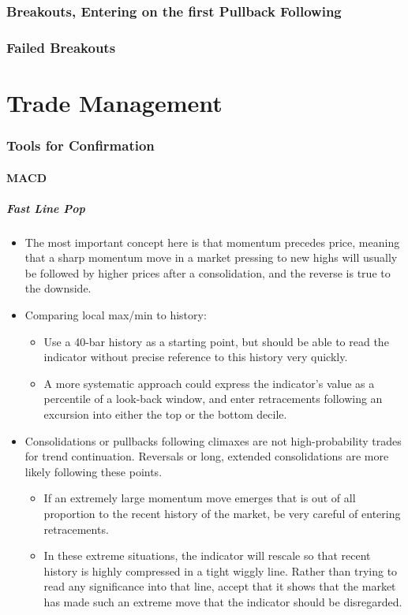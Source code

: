 \documentclass{../notes}
\begin{document}
\section{Breakouts, Entering on the first Pullback Following}
\section{Failed Breakouts}

\part{Trade Management}
\section{Tools for Confirmation}
\subsection{MACD}
\subsubsection{Fast Line Pop}
\begin{itemize}
  \item The most important concept here is that momentum precedes price, meaning that a sharp momentum move in a market pressing to new highs will usually be followed by higher prices after a consolidation, and the reverse is true to the downside.
  \item Comparing local max/min to history:
  \begin{itemize}
    \item Use a 40-bar history as a starting point, but should be able to read the indicator without precise reference to this history very quickly.
    \item A more systematic approach could express the indicator’s value as a percentile of a look-back window, and enter retracements following an excursion into either the top or the bottom decile.
  \end{itemize}
  \item Consolidations or pullbacks following climaxes are not high-probability trades for trend continuation. Reversals or long, extended consolidations are more likely following these points.
  \begin{itemize}
    \item If an extremely large momentum move emerges that is out of all proportion to the recent history of the market, be very careful of entering retracements.
    \item In these extreme situations, the indicator will rescale so that recent history is highly compressed in a tight wiggly line. Rather than trying to read any significance into that line, accept that it shows that the market has made such an extreme move that the indicator should be disregarded.
  \end{itemize}
\end{itemize}
\end{document}
